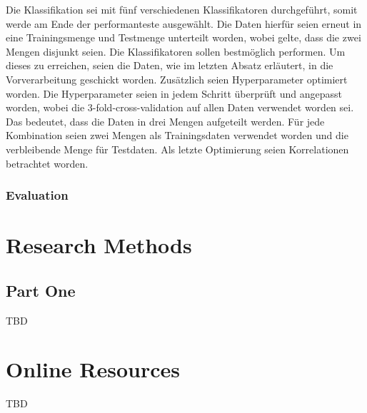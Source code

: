 \documentclass[sigplan,screen]{acmart}
\begin{document}
Die Klassifikation sei mit fünf verschiedenen Klassifikatoren durchgeführt, somit werde am Ende der performanteste ausgewählt. Die Daten hierfür seien erneut in eine Trainingsmenge und Testmenge unterteilt worden, wobei gelte, dass die zwei Mengen disjunkt seien. Die Klassifikatoren sollen bestmöglich performen. Um dieses zu erreichen, seien die Daten, wie im letzten Absatz erläutert, in die Vorverarbeitung geschickt worden. Zusätzlich seien Hyperparameter optimiert worden. Die Hyperparameter seien in jedem Schritt überprüft und angepasst worden, wobei die 3-fold-cross-validation auf allen Daten verwendet worden sei. Das bedeutet, dass die Daten in drei Mengen aufgeteilt werden. Für jede Kombination seien zwei Mengen als Trainingsdaten verwendet worden und die verbleibende Menge für Testdaten. Als letzte Optimierung seien Korrelationen betrachtet worden.

\subsubsection{Evaluation}







\cite{Hohlfeld01}



\appendix

\section{Research Methods}

\subsection{Part One}

TBD


\section{Online Resources}

TBD
\end{document}
